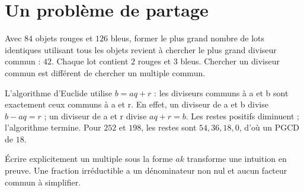 \documentclass[../cours_2de.tex]{subfiles}
\begin{document}
\section{Un problème de partage}
Avec $84$ objets rouges et $126$ bleus, former le plus grand nombre de lots identiques utilisant tous les objets revient à chercher le plus grand diviseur commun : $42$. Chaque lot contient $2$ rouges et $3$ bleus. Chercher un diviseur commun est différent de chercher un multiple commun.

\approfondissement L'algorithme d'Euclide utilise $b=aq+r$ : les diviseurs communs à a et b sont exactement ceux communs à a et r. En effet, un diviseur de a et b divise $b-aq=r$ ; un diviseur de a et r divise $aq+r=b$. Les restes positifs diminuent ; l'algorithme termine. Pour $252$ et $198$, les restes sont $54,36,18,0$, d'où un PGCD de $18$.
\begin{retenir}
Écrire explicitement un multiple sous la forme $ak$ transforme une intuition en preuve. Une fraction irréductible a un dénominateur non nul et aucun facteur commun à simplifier.
\end{retenir}
\end{document}
